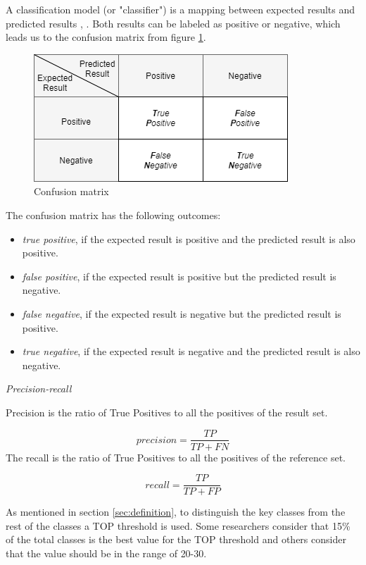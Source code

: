 \documentclass[12pt, a4paper, twoside]{report}
\begin{document}
A classification model (or "classifier") is a mapping between expected results and predicted results \cite{ROCIntro}, \cite{ROCBRADLEY19971145}. Both results can be labeled as positive or negative, which leads us to the confusion matrix from figure \ref{fig:confusion}. 
\begin{figure}[h]
\centering
\includegraphics[scale=0.9]{confusion.png}
\caption{Confusion matrix}
\label{fig:confusion}
\centering
\end{figure}
The confusion matrix has the following outcomes:
		\begin{itemize}
			\item \textit{true positive}, if the expected result is positive and the predicted result is also positive.
			\item \textit{false positive}, if the expected result is positive but the predicted result is negative.
			\item \textit{false negative}, if the expected result is negative but the predicted result is positive.
			\item \textit{true negative}, if the expected result is negative and the predicted result is also negative.
		\end{itemize}


\textit{Precision-recall}


Precision is the ratio of True Positives to all the positives of the result set.

\begin{equation}
 precision = \frac{TP}{TP+FN}
\end{equation}
The recall is the ratio of True Positives to all the positives of the reference set.

\begin{equation}
 recall = \frac{TP}{TP+FP}
\end{equation}

As mentioned in section \ref{sec:definition}, to distinguish the key classes from the rest of the classes a TOP threshold is used. Some researchers consider that 15\% of the total classes is the best value for the TOP threshold and others consider that the value should be in the range of 20-30. 
\end{document}
